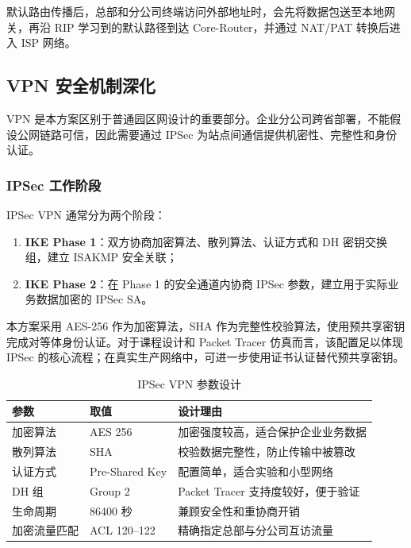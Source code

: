\documentclass[12pt,a4paper]{ctexart}
\begin{document}
默认路由传播后，总部和分公司终端访问外部地址时，会先将数据包送至本地网关，再沿 RIP 学习到的默认路径到达 Core-Router，并通过 NAT/PAT 转换后进入 ISP 网络。

\subsection{VPN 安全机制深化}

VPN 是本方案区别于普通园区网设计的重要部分。企业分公司跨省部署，不能假设公网链路可信，因此需要通过 IPSec 为站点间通信提供机密性、完整性和身份认证。

\subsubsection{IPSec 工作阶段}

IPSec VPN 通常分为两个阶段：

\begin{enumerate}[label=(\arabic*), leftmargin=2em]
    \item \textbf{IKE Phase 1}：双方协商加密算法、散列算法、认证方式和 DH 密钥交换组，建立 ISAKMP 安全关联；
    \item \textbf{IKE Phase 2}：在 Phase 1 的安全通道内协商 IPSec 参数，建立用于实际业务数据加密的 IPSec SA。
\end{enumerate}

本方案采用 AES-256 作为加密算法，SHA 作为完整性校验算法，使用预共享密钥完成对等体身份认证。对于课程设计和 Packet Tracer 仿真而言，该配置足以体现 IPSec 的核心流程；在真实生产网络中，可进一步使用证书认证替代预共享密钥。

\begin{table}[H]
\centering
\caption{IPSec VPN 参数设计}
\label{tab:vpn-param}
\begin{tabular}{|p{4cm}|p{4cm}|p{5cm}|}
\hline
\textbf{参数} & \textbf{取值} & \textbf{设计理由} \\ \hline
加密算法 & AES 256 & 加密强度较高，适合保护企业业务数据 \\ \hline
散列算法 & SHA & 校验数据完整性，防止传输中被篡改 \\ \hline
认证方式 & Pre-Shared Key & 配置简单，适合实验和小型网络 \\ \hline
DH 组 & Group 2 & Packet Tracer 支持度较好，便于验证 \\ \hline
生命周期 & 86400 秒 & 兼顾安全性和重协商开销 \\ \hline
加密流量匹配 & ACL 120--122 & 精确指定总部与分公司互访流量 \\ \hline
\end{tabular}
\end{table}
\end{document}
